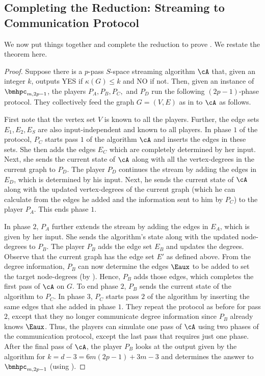 \subsection{Completing the Reduction: Streaming to Communication Protocol}
We now put things together and complete the reduction to prove . We restate the theorem here. 

\mainthmdegen*


\begin{proof}
Suppose there is a $p$-pass $S$-space streaming algorithm $\cA$ that, given an integer $k$, outputs YES if $\kappa(G)\leq k$ and NO if not. Then, given an instance of $\bmhpc_{m,2p-1}$, the players $P_A, P_B, P_C,$ and $P_D$ run the following $(2p-1)$-phase protocol. They collectively feed the graph $G=(V,E)$ as in  to $\cA$ as follows. 

First note that the vertex set $V$ is known to all the players. Further, the edge sets $E_1,E_2,E_S$ are also input-independent and known to all players. In phase $1$ of the protocol, $P_C$ starts pass $1$ of the algorithm $\cA$ and inserts the edges in these sets. She then adds the edges $E_C$ which are completely determined by her input. Next, she sends the current state of $\cA$ along with all the vertex-degrees in the current graph to $P_D$. The player $P_D$ continues the stream by adding the edges in $E_D$, which is determined by his input. Next, he sends the current state of $\cA$ along with the updated vertex-degrees of the current graph (which he can calculate from the edges he added and the information sent to him by $P_C$) to the player $P_A$. This ends phase $1$.

In phase $2$, $P_A$ further extends the stream by adding the edges in $E_A$, which is given by her input. She sends the algorithm's state along with the updated node-degrees to $P_B$. The player $P_B$ adds the edge set $E_B$ and updates the degrees. Observe that the current graph has the edge set $E'$ as defined above. From the degree information, $P_B$ can now determine the edges $\Eaux$ to be added to set the target node-degrees (by ). Hence, $P_B$ adds those edges, which completes the first pass of $\cA$ on $G$. To end phase $2$, $P_B$ sends the current state of the algorithm to $P_C$. In phase $3$, $P_C$ starts pass $2$ of the algorithm by inserting the same edges that she added in phase $1$. They repeat the protocol as before for pass $2$, except that they no longer communicate degree information since $P_B$ already knows $\Eaux$. Thus, the players can simulate one pass of $\cA$ using two phases of the communication protocol, except the last pass that requires just one phase. After the final pass of $\cA$, the player $P_B$ looks at the output given by the algorithm for $k = d-3 = 6m(2p-1)+3m-3$ and determines the answer to $\bmhpc_{m,2p-1}$ (using ). 


\end{proof}
